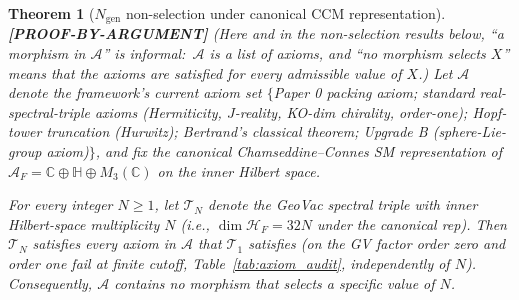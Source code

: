 \documentclass[11pt]{article}
\newtheorem{theorem}{Theorem}
\begin{document}

\begin{theorem}[$N_{\mathrm{gen}}$ non-selection under canonical CCM representation]
\label{thm:n_gen_non_selection}
\textbf{[PROOF-BY-ARGUMENT]} (Here and in the non-selection results
below, ``a morphism in $\mathcal{A}$'' is informal:\ $\mathcal{A}$ is a
list of axioms, and ``no morphism selects $X$'' means that the axioms
are satisfied for every admissible value of $X$.)
Let $\mathcal{A}$ denote the framework's current axiom set
$\{$Paper 0 packing axiom; standard real-spectral-triple axioms
(Hermiticity, $J$-reality, KO-dim chirality, order-one); Hopf-tower
truncation (Hurwitz); Bertrand's classical theorem; Upgrade B
(sphere-Lie-group axiom)$\}$, and fix the canonical Chamseddine--Connes
SM representation of $\mathcal{A}_F = \mathbb{C} \oplus \mathbb{H}
\oplus M_3(\mathbb{C})$ on the inner Hilbert space.

For every integer $N \ge 1$, let $\mathcal{T}_N$ denote the GeoVac
spectral triple with inner Hilbert-space multiplicity $N$ (i.e.,
$\dim \mathcal{H}_F = 32 N$ under the canonical rep).  Then
$\mathcal{T}_N$ satisfies every axiom in $\mathcal{A}$ that
$\mathcal{T}_1$ satisfies (on the GV factor order zero and order one
fail at finite cutoff, Table~\ref{tab:axiom_audit}, independently of
$N$).  Consequently,
$\mathcal{A}$ contains no morphism that selects a specific value
of $N$.
\end{theorem}
\end{document}
